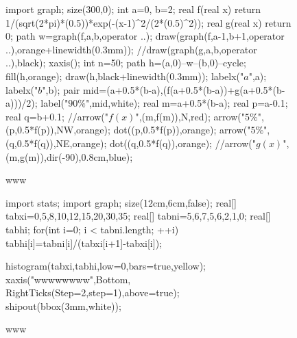\documentclass[a4paper]{book}
\begin{document}
\begin{figure}[!ht]
	\centering
	\begin{asy}
	import graph;
	size(300,0);
	int a=0, b=2;
	real f(real x) {return 1/(sqrt(2*pi)*(0.5))*exp(-(x-1)^2/(2*(0.5)^2));}
	real g(real x) {return 0;}
	path w=graph(f,a,b,operator ..);
	draw(graph(f,a-1,b+1,operator ..),orange+linewidth(0.3mm));
	//draw(graph(g,a,b,operator ..),black);
	xaxis();
	int n=50;
	path h=(a,0)--w--(b,0)--cycle;
	fill(h,orange);
	draw(h,black+linewidth(0.3mm));
	labelx("$a$",a);
	labelx("$b$",b);
	pair mid=(a+0.5*(b-a),(f(a+0.5*(b-a))+g(a+0.5*(b-a)))/2);
	label("$90\%$",mid,white);
	real m=a+0.5*(b-a);
	real p=a-0.1;
	real q=b+0.1;
	//arrow("$f(x)$",(m,f(m)),N,red);
	arrow("$5\%$",(p,0.5*f(p)),NW,orange);
	dot((p,0.5*f(p)),orange);
	arrow("$5\%$",(q,0.5*f(q)),NE,orange);
	dot((q,0.5*f(q)),orange);
	//arrow("$g(x)$",(m,g(m)),dir(-90),0.8cm,blue);
	\end{asy}
	\caption{www}
\end{figure}


\begin{figure}[!ht]
	\centering
	\begin{asy}
	import stats;
import graph;
size(12cm,6cm,false);
real[] tabxi={0,5,8,10,12,15,20,30,35};
real[] tabni={5,6,7,5,6,2,1,0};
real[] tabhi;
for(int i=0; i < tabni.length; ++i)
  tabhi[i]=tabni[i]/(tabxi[i+1]-tabxi[i]);

histogram(tabxi,tabhi,low=0,bars=true,yellow);
xaxis("wwwwwwww",Bottom, RightTicks(Step=2,step=1),above=true);
shipout(bbox(3mm,white));
	\end{asy}
	\caption{www}
\end{figure}
\end{document}
